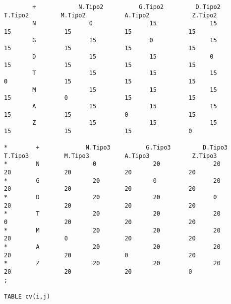 \documentclass[]{article}
\begin{document}
\begin{lstlisting}
        +            N.Tipo2          G.Tipo2         D.Tipo2           T.Tipo2         M.Tipo2           A.Tipo2            Z.Tipo2
        N               0                15               15               15               15               15                15
        G               15               0                15               15               15               15                15
        D               15               15               0                15               15               15                15
        T               15               15               15               0                15               15                15
        M               15               15               15               15               0                15                15
        A               15               15               15               15               15               0                 15
        Z               15               15               15               15               15               15                0

*        +             N.Tipo3          G.Tipo3         D.Tipo3          T.Tipo3          M.Tipo3          A.Tipo3            Z.Tipo3
*        N               0                20               20               20               20               20                20
*        G               20               0                20               20               20               20                20
*        D               20               20               0                20               20               20                20
*        T               20               20               20               0                20               20                20
*        M               20               20               20               20               0                20                20
*        A               20               20               20               20               20               0                 20
*        Z               20               20               20               20               20               20                0
;

TABLE cv(i,j)


\end{lstlisting}
\end{document}
